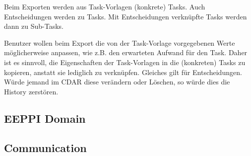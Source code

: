 				Beim Exporten werden aus Task-Vorlagen (konkrete) Tasks.
				Auch Entscheidungen werden zu Tasks.
				Mit Entscheidungen verknüpfte Tasks werden dann zu Sub-Tasks.
				
				Benutzer wollen beim Export die von der Task-Vorlage vorgegebenen Werte möglicherweise anpassen, wie z.B. den erwarteten Aufwand für den Task.
				Daher ist es sinnvoll, die Eigenschaften der Task-Vorlagen in die (konkreten) Tasks zu kopieren, anstatt sie lediglich zu verknüpfen.
				Gleiches gilt für Entscheidungen. Würde jemand im CDAR diese verändern oder Löschen, so würde dies die History zerstören.
			
		
		\subsection{EEPPI Domain}
			
				
		
		\subsection{Communication}